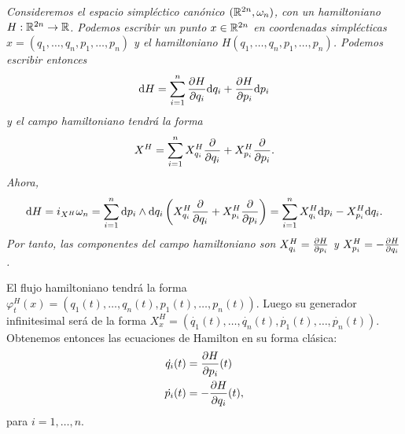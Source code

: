 \begin{ejemplo}
  \em
  Consideremos el espacio simpléctico canónico $(\mathbb{R}^{2n},\omega_n)$, con un hamiltoniano $H:\mathbb{R}^{2n}\rightarrow \mathbb{R}$. Podemos escribir un punto $x\in \mathbb{R}^{2n}$ en coordenadas simplécticas $x = (q_1,\dots,q_n,p_1,\dots,p_n)$ y el hamiltoniano $H(q_1,\dots,q_n,p_1,\dots,p_n)$. Podemos escribir entonces
  \begin{equation*}
    \mathrm{d} H = \sum_{i=1}^n \frac{\partial H}{\partial q_i} \mathrm{d}{q_i} + \frac{\partial H}{\partial p_i} \mathrm{d}{p_i}
  \end{equation*}
  y el campo hamiltoniano tendrá la forma
  \begin{equation*}
    X^H = \sum_{i=1}^n X_{q_i}^H \frac{\partial}{\partial q_i} + X_{p_i}^H \frac{\partial}{\partial p_i}.
  \end{equation*}
  Ahora, 
  \begin{equation*}
    \mathrm{d} H = i_{X^H}\omega_n = \sum_{i=1}^n \mathrm{d} p_i \wedge \mathrm{d} q_i \left(X_{q_i}^H \frac{\partial}{\partial q_i} + X^H_{p_i} \frac{\partial}{\partial p_i}\right)  = \sum_{i=1}^n X_{q_i}^H \mathrm{d} p_i -X_{p_i}^H \mathrm{d} q_i.
  \end{equation*}
  Por tanto, las componentes del campo hamiltoniano son $X^H_{q_i}=\frac{\partial H}{\partial p_i}$ y $X^H_{p_i}=-\frac{\partial H}{\partial q_i}$.

  El flujo hamiltoniano tendrá la forma $\varphi^H_t(x) = (q_1(t),\dots,q_n(t),p_1(t),\dots,p_n(t))$. Luego su generador infinitesimal será de la forma $X^H_x=(\dot{q_1}(t),\dots,\dot{q_n}(t),\dot{p_1}(t),\dots,\dot{p_n}(t))$. Obtenemos entonces las ecuaciones de Hamilton en su forma clásica:
  \begin{align*}
     \dot{q_i}(t) & = \frac{\partial H}{\partial p_i}(t) \\
     \dot{p_i}(t) & = -\frac{\partial H}{\partial q_i} (t),
  \end{align*}
  para $i=1,\dots,n$.
\end{ejemplo}

